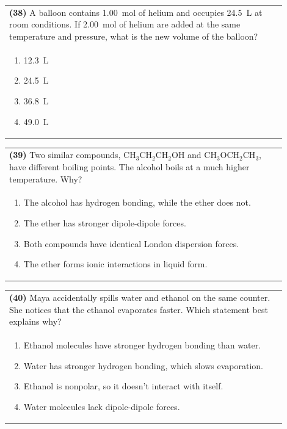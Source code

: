\documentclass{article}
\begin{document}
{{\noindent\begin{tabular}{|p{0.9\linewidth}|}
\hline
\textbf{(38)} A balloon contains 1.00~mol of helium and occupies 24.5~L at room conditions. If 2.00~mol of helium are added at the same temperature and pressure, what is the new volume of the balloon?\\[0.2cm]
\begin{minipage}[t]{0.85\linewidth}
\begin{enumerate}[label=\alph*.]
\item 12.3~L
\item 24.5~L
\item 36.8~L
\item 49.0~L
\end{enumerate}
\end{minipage}\\[0.2cm]
\hline
\end{tabular}

\vspace{0.2cm}
\noindent\begin{tabular}{|p{0.9\linewidth}|}
\hline
\textbf{(39)} Two similar compounds, CH$_3$CH$_2$CH$_2$OH and CH$_3$OCH$_2$CH$_3$, have different boiling points. The alcohol boils at a much higher temperature. Why?\\[0.2cm]
\begin{minipage}[t]{0.85\linewidth}
\begin{enumerate}[label=\alph*.]
\item The alcohol has hydrogen bonding, while the ether does not.
\item The ether has stronger dipole-dipole forces.
\item Both compounds have identical London dispersion forces.
\item The ether forms ionic interactions in liquid form.
\end{enumerate}
\end{minipage}\\[0.2cm]
\hline
\end{tabular}

\noindent\begin{tabular}{|p{0.9\linewidth}|}
\hline
\textbf{(40)} Maya accidentally spills water and ethanol on the same counter. She notices that the ethanol evaporates faster. Which statement best explains why?\\[0.2cm]
\begin{minipage}[t]{0.85\linewidth}
\begin{enumerate}[label=\alph*.]
\item Ethanol molecules have stronger hydrogen bonding than water. 
\item Water has stronger hydrogen bonding, which slows evaporation.
\item Ethanol is nonpolar, so it doesn't interact with itself.
\item Water molecules lack dipole-dipole forces.
\end{enumerate}
\end{minipage}\\[0.2cm]
\hline
\end{tabular}
\newpage

}}
\end{document}
